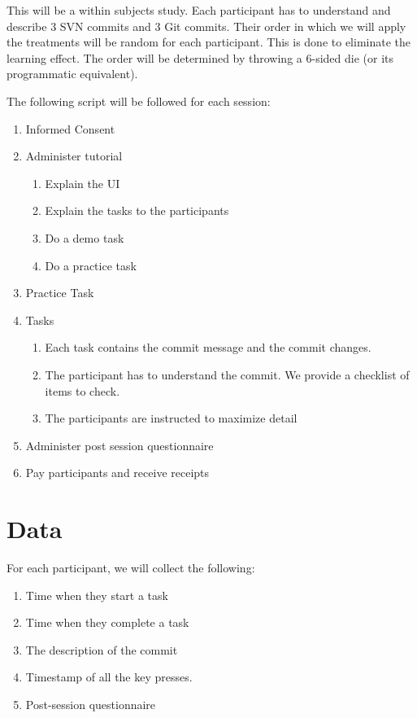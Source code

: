 \documentclass[letterpaper]{article}
\begin{document}
This will be a within subjects study. 
Each participant has to understand and describe 3 SVN commits and 3 Git commits. 
Their order in which we will apply the treatments will be random for each participant. 
This is done to eliminate the learning effect. 
The order will be determined by throwing a 6-sided die (or its programmatic equivalent).

The following script will be followed for each session:
\begin{enumerate}
	\item Informed Consent
	\item Administer tutorial
	\begin{enumerate}
		\item Explain the UI
		\item Explain the tasks to the participants
		\item Do a demo task
		\item Do a practice task
	\end{enumerate}
	\item Practice Task
	\item Tasks
	\begin{enumerate}
		\item Each task contains the commit message and the commit changes.
		\item The participant has to understand the commit. We provide a checklist of items to check.
		\item The participants are instructed to maximize detail
	\end{enumerate}
	\item Administer post session questionnaire
	\item Pay participants and receive receipts 
\end{enumerate}

\section{Data}

For each participant, we will collect the following:
\begin{enumerate}
	\item Time when they start a task
	\item Time when they complete a task
	\item The description of the commit
	\item Timestamp of all the key presses.
	\item Post-session questionnaire
\end{enumerate}
\end{document}
